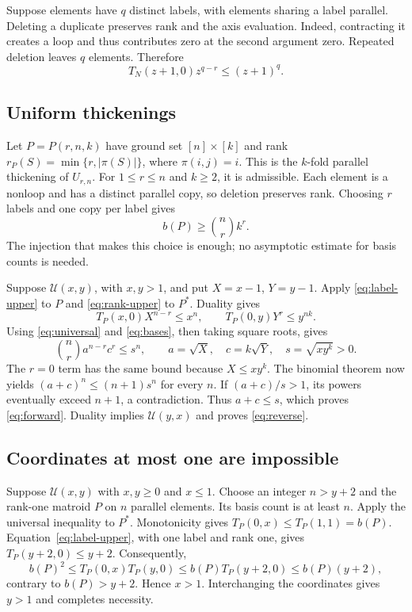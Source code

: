 \documentclass[11pt,a4paper]{article}
\newcommand{\U}{\mathcal U}
\begin{document}
Suppose elements have $q$ distinct labels, with elements sharing a label
parallel. Deleting a duplicate preserves rank and the axis evaluation.
Indeed, contracting it creates a loop and thus contributes zero at the
second argument zero. Repeated deletion leaves $q$ elements. Therefore
\begin{equation}\label{eq:label-upper}
T_N(z+1,0)z^{q-r}\leq(z+1)^q.
\end{equation}

\subsection{Uniform thickenings}
Let $P=P(r,n,k)$ have ground set $[n]\times[k]$ and rank
$r_P(S)=\min\{r,|\pi(S)|\}$, where $\pi(i,j)=i$.
This is the $k$-fold parallel thickening of $U_{r,n}$.
For $1\leq r\leq n$ and $k\geq2$, it is admissible.
Each element is a nonloop and has a distinct parallel copy, so deletion
preserves rank. Choosing $r$ labels and one copy per label gives
\begin{equation}\label{eq:bases}
b(P)\geq\binom nr k^r.
\end{equation}
The injection that makes this choice is enough; no asymptotic estimate
for basis counts is needed.

Suppose $\U(x,y)$, with $x,y>1$, and put $X=x-1$, $Y=y-1$.
Apply \eqref{eq:label-upper} to $P$ and \eqref{eq:rank-upper} to $P^*$.
Duality gives
\[
T_P(x,0)X^{n-r}\leq x^n,\qquad T_P(0,y)Y^r\leq y^{nk}.
\]
Using \eqref{eq:universal} and \eqref{eq:bases}, then taking square roots,
gives
\[
\binom nr a^{n-r}c^r\leq s^n,
\qquad a=\sqrt X,\quad c=k\sqrt Y,\quad s=\sqrt{xy^k}>0.
\]
The $r=0$ term has the same bound because $X\leq xy^k$.
The binomial theorem now yields $(a+c)^n\leq(n+1)s^n$ for every $n$.
If $(a+c)/s>1$, its powers eventually exceed $n+1$, a contradiction.
Thus $a+c\leq s$, which proves \eqref{eq:forward}.
Duality implies $\U(y,x)$ and proves \eqref{eq:reverse}.

\subsection{Coordinates at most one are impossible}
Suppose $\U(x,y)$ with $x,y\geq0$ and $x\leq1$.
Choose an integer $n>y+2$ and the rank-one matroid $P$ on $n$ parallel
elements. Its basis count is at least $n$. Apply the universal inequality
to $P^*$. Monotonicity gives $T_P(0,x)\leq T_P(1,1)=b(P)$.
Equation~\eqref{eq:label-upper}, with one label and rank one, gives
$T_P(y+2,0)\leq y+2$. Consequently,
\[
b(P)^2\leq T_P(0,x)T_P(y,0)
\leq b(P)T_P(y+2,0)\leq b(P)(y+2),
\]
contrary to $b(P)>y+2$. Hence $x>1$. Interchanging the coordinates gives
$y>1$ and completes necessity.
\end{document}
